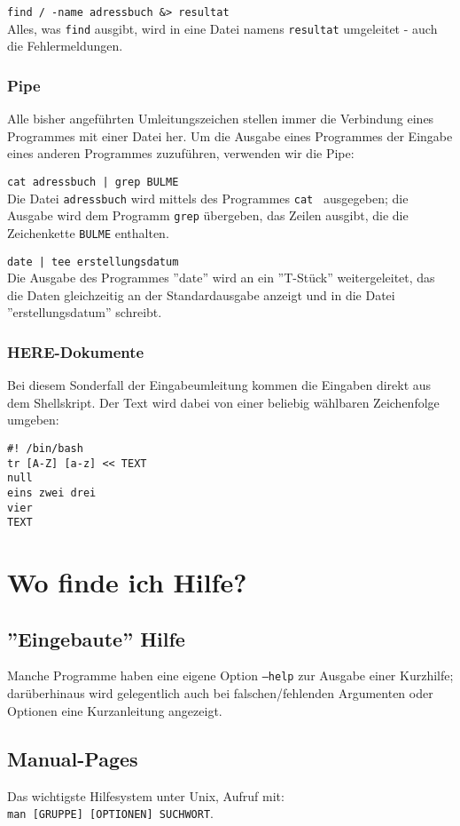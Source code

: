\documentclass[11pt]{article}
\begin{document}
\texttt{find / -name adressbuch \&> resultat} \\ 
Alles, was \texttt{find} ausgibt, wird in eine Datei namens
\texttt{resultat} umgeleitet - auch die Fehlermeldungen.

\subsubsection{Pipe}
Alle bisher angeführten Umleitungszeichen stellen immer die Verbindung
eines Programmes mit einer Datei her. Um die Ausgabe eines Programmes
der Eingabe eines anderen Programmes zuzuführen, verwenden wir die
Pipe:

\texttt{cat adressbuch | grep BULME} \\
Die Datei \texttt{adressbuch} wird mittels des Programmes \texttt{cat
} ausgegeben; die Ausgabe wird dem Programm \texttt{grep} übergeben, das
Zeilen ausgibt, die die Zeichenkette \texttt{BULME} enthalten.

\texttt{date | tee erstellungsdatum} \\
Die Ausgabe des Programmes ''date'' wird an ein ''T-Stück''
weitergeleitet, das die Daten gleichzeitig an der Standardausgabe
anzeigt und in die Datei ''erstellungsdatum'' schreibt.
 
\subsubsection{HERE-Dokumente}
Bei diesem Sonderfall der Eingabeumleitung kommen die Eingaben direkt
aus dem Shellskript. Der Text wird dabei von einer beliebig wählbaren
Zeichenfolge umgeben:
\begin{verbatim}
#! /bin/bash
tr [A-Z] [a-z] << TEXT
null
eins zwei drei
vier 
TEXT
\end{verbatim}

\section{Wo finde ich Hilfe?}
\subsection{''Eingebaute'' Hilfe}
Manche Programme haben eine eigene Option \texttt{--help} zur Ausgabe
einer Kurzhilfe; darüberhinaus wird gelegentlich auch bei
falschen/fehlenden Argumenten oder Optionen eine Kurzanleitung
angezeigt.

\subsection{Manual-Pages}
Das wichtigste Hilfesystem unter Unix, Aufruf mit: \\
 \texttt{man [GRUPPE] [OPTIONEN] SUCHWORT}.\\
\end{document}
